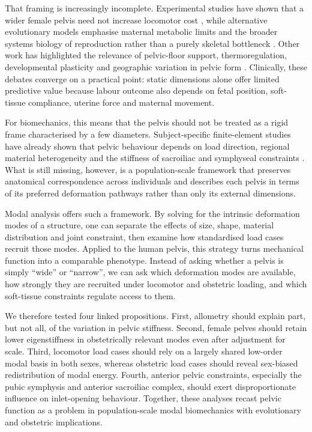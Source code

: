 \documentclass[11pt,a4paper]{article}
\begin{document}
That framing is increasingly incomplete. Experimental studies have shown that a wider female pelvis need not increase locomotor cost \citep{Warrener2015}, while alternative evolutionary models emphasise maternal metabolic limits and the broader systems biology of reproduction rather than a purely skeletal bottleneck \citep{Dunsworth2012}. Other work has highlighted the relevance of pelvic-floor support, thermoregulation, developmental plasticity and geographic variation in pelvic form \citep{Pavlicev2020,BettiManica2018,Novak2020}. Clinically, these debates converge on a practical point: static dimensions alone offer limited predictive value because labour outcome also depends on fetal position, soft-tissue compliance, uterine force and maternal movement.

For biomechanics, this means that the pelvis should not be treated as a rigid frame characterised by a few diameters. Subject-specific finite-element studies have already shown that pelvic behaviour depends on load direction, regional material heterogeneity and the stiffness of sacroiliac and symphyseal constraints \citep{Eichenseer2011,Hammer2013}. What is still missing, however, is a population-scale framework that preserves anatomical correspondence across individuals and describes each pelvis in terms of its preferred deformation pathways rather than only its external dimensions.

Modal analysis offers such a framework. By solving for the intrinsic deformation modes of a structure, one can separate the effects of size, shape, material distribution and joint constraint, then examine how standardised load cases recruit those modes. Applied to the human pelvis, this strategy turns mechanical function into a comparable phenotype. Instead of asking whether a pelvis is simply ``wide'' or ``narrow'', we can ask which deformation modes are available, how strongly they are recruited under locomotor and obstetric loading, and which soft-tissue constraints regulate access to them.

We therefore tested four linked propositions. First, allometry should explain part, but not all, of the variation in pelvic stiffness. Second, female pelves should retain lower eigenstiffness in obstetrically relevant modes even after adjustment for scale. Third, locomotor load cases should rely on a largely shared low-order modal basis in both sexes, whereas obstetric load cases should reveal sex-biased redistribution of modal energy. Fourth, anterior pelvic constraints, especially the pubic symphysis and anterior sacroiliac complex, should exert disproportionate influence on inlet-opening behaviour. Together, these analyses recast pelvic function as a problem in population-scale modal biomechanics with evolutionary and obstetric implications.
\end{document}
